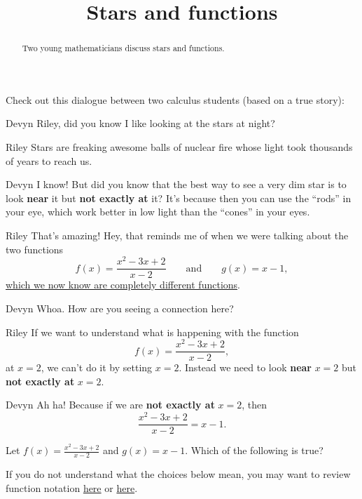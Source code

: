 \documentclass{ximera}
\title[Break-Ground:]{Stars and functions}
\begin{document}
\begin{abstract}
Two young mathematicians discuss stars and functions.
\end{abstract}
\maketitle

Check out this dialogue between two calculus students (based on a true
story):

\begin{dialogue}
\item[Devyn] Riley, did you know I like looking at the stars at night?
\item[Riley] Stars are freaking awesome balls of nuclear fire whose
  light took thousands of years to reach us.
\item[Devyn] I know! But did you know that the best way to see a very
  dim star is to look \textbf{near} it but \textbf{not exactly at} it? It's
  because then you can use the ``rods'' in your eye, which work better
  in low light than the ``cones'' in your eyes.
\item[Riley] That's amazing! Hey, that reminds me of when we were talking about the two functions
  \[
  f(x) = \frac{x^2-3x+2}{x-2}\qquad\text{and}\qquad g(x)= x-1,
  \]
  \href{https://ximera.osu.edu/math160fa17/m160prerequisites/PreRequisiteXards/U6MultiplyingAndFactoringPolynomials/6.3SimplifyingRationalFunctions/breakGround}{which we now know are completely different functions}.
\item[Devyn] Whoa. How are you seeing a connection here?
\item[Riley] If we want to understand what is happening with the
  function
  \[
  f(x) = \frac{x^2-3x+2}{x-2},
  \]
  at $x=2$, we can't do it by setting $x=2$. Instead we need to look
  \textbf{near} $x=2$ but \textbf{not exactly at} $x=2$.
  \item[Devyn] Ah ha! Because if we are \textbf{not exactly at} $x=2$,
    then
    \[
    \frac{x^2-3x+2}{x-2} = x-1.
    \]
\end{dialogue}

\begin{problem}
  Let $f(x) = \frac{x^2-3x+2}{x-2}$ and $g(x) = x-1$. Which of the following is true?
  
  \begin{hint}
If you do not understand what the choices below mean, you may want to review function notation \href{https://ximera.osu.edu/math160fa17/m160prerequisites/prerequisiteVideos/functionNotation}{here} or \href{https://ximera.osu.edu/math160fa17/m160prerequisites/understandingFunctions/digInForEachInputExactlyOneOutput}{here}.
  \end{hint}
  
   \begin{multipleChoice}
  \end{multipleChoice}
\end{problem}
\end{document}
